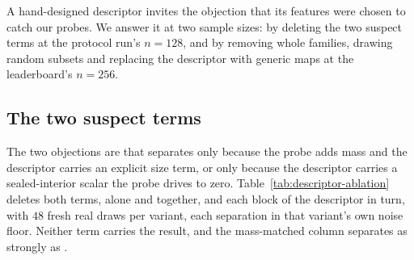 A hand-designed descriptor invites the objection that its features were chosen to catch
our probes. We answer it at two sample sizes: by deleting the two suspect terms at the
protocol run's $n{=}128$, and by removing whole families, drawing random subsets and
replacing the descriptor with generic maps at the leaderboard's $n{=}256$.

\subsection{The two suspect terms}
\label{app:descriptor}

The two objections are that \vkid{} separates \solidify{} only because the probe
adds mass and the descriptor carries an explicit size term, or only because the
descriptor carries a sealed-interior scalar the probe drives to zero.
Table~\ref{tab:descriptor-ablation} deletes both terms, alone and together, and
each block of the descriptor in turn, with $48$ fresh real draws per variant,
each separation in that variant's own noise floor. Neither term carries the
result, and the mass-matched \growshell{} column separates as strongly as
\solidify{}.

